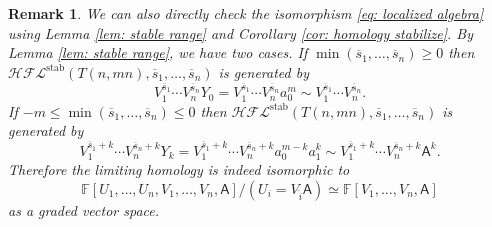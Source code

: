 \documentclass{amsart}
\newtheorem{remark}[theorem]{Remark}
\newcommand{\cHFL}{\mathcal{H\!F\! L}}
\newcommand{\ovl}{\overline}
\newcommand{\A}{\mathfrak{A}}
\newcommand{\cc}{\mathbf{c}}
\newcommand{\stab}{\mathrm{stab}}
\newcommand{\AAA}{\mathsf{A}}
\begin{document}
\begin{remark}


We can also directly check the isomorphism \eqref{eq: localized algebra} using Lemma \ref{lem: stable range} and Corollary \ref{cor: homology stabilize}. By Lemma \ref{lem: stable range}, we have two cases. If $\min(\overline{s}_1,\ldots,\overline{s}_n)\ge 0$ then $\cHFL^{\stab}(T(n,mn),\overline{s}_1,\ldots,\overline{s}_n)$ is generated by 
$$
V_1^{\overline{s}_1}\cdots V_n^{\overline{s}_n}Y_0=V_1^{\overline{s}_1}\cdots V_n^{\overline{s}_n}a_0^m\sim V_1^{\overline{s}_1}\cdots V_n^{\overline{s}_n}.
$$
If  $-m\le \min(\overline{s}_1,\ldots,\overline{s}_n)\le 0$ then $\cHFL^{\stab}(T(n,mn),\ovl{s}_1,\ldots,\ovl{s}_n)$ is generated by 
$$
V_1^{\overline{s}_1+k}\cdots V_n^{\overline{s}_n+k}Y_k=V_1^{\overline{s}_1+k}\cdots V_n^{\overline{s}_n+k}a_0^{m-k}a_1^k\sim V_1^{\overline{s}_1+k}\cdots V_n^{\overline{s}_n+k}\AAA^k.
$$
Therefore the limiting homology is indeed isomorphic to 
$$\mathbb{F}[U_1,\ldots,U_n,V_1,\ldots,V_n,\AAA]/(U_i=V_{\hat{i}}\AAA)\simeq \mathbb{F}[V_1,\ldots,V_n,\AAA]$$ 
as a graded vector space.




\end{remark}
\end{document}
